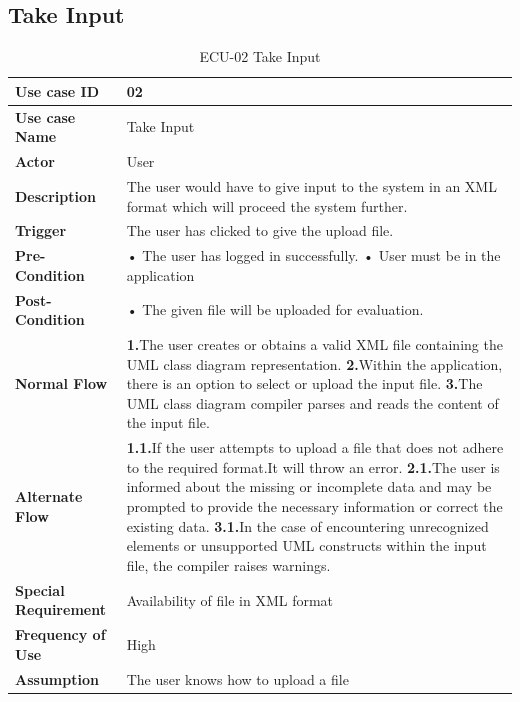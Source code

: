 \documentclass[12pt,a4paper]{article}
\begin{document}
 \subsection{Take Input}
\begin{table}[h!]
\caption{ECU-02 Take Input}
    \centering
    \begin{tabular}{|l|p{10cm}|}
    \hline
       \textbf{Use case ID}&02 \\ %
       \hline
       \textbf{Use case Name}&Take Input \\ %
       \hline
       \textbf{Actor}&User \\ %
       \hline
       \textbf{Description}&The user would have to give input to the system in an XML format which will proceed the system further.\\ %
       \hline
       \textbf{Trigger}&The user has clicked to give the upload file. \\ %
        \hline
       \textbf{Pre-Condition}&
   \newline• The user has logged in successfully.
    \newline• User must be in the application
\\ %
        \hline
       \textbf{Post-Condition}&• The given file will be uploaded for evaluation.
 \\ %
        \hline
       \textbf{Normal Flow}&
    \textbf{1.}The user creates or obtains a valid XML file containing the UML class diagram representation.
\newline\textbf{2.}Within the application, there is an option to select or upload the input file.
\newline\textbf{3.}The UML class diagram compiler parses and reads the content of the input file.\\ %
\hline
       \textbf{Alternate Flow}&
       \textbf{1.1.}If the user attempts to upload a file that does not adhere to the required format.It will throw an error.
\newline\textbf{2.1.}The user is informed about the missing or incomplete data and may be prompted to provide the necessary information or correct the existing data.
\newline\textbf{3.1.}In the case of encountering unrecognized elements or unsupported UML constructs within the input file, the compiler raises warnings.\\ %
        \hline
       \textbf{Special Requirement}&Availability of file in XML format \\ %
        \hline
       \textbf{Frequency of Use}&High \\ %
        \hline
       \textbf{Assumption}&The user knows how to upload a file \\ %
       \hline
    \end{tabular} 
    \end{table}
\end{document}
